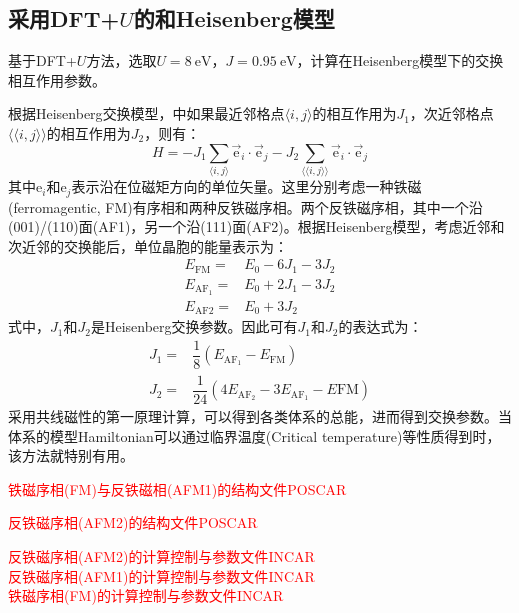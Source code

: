 \subsection{采用\rm{DFT}+$U$的和\rm{Heisenberg}模型}
基于\textrm{DFT}+$U$方法，选取$U=8~\mathrm{eV}$，$J=0.95~\mathrm{eV}$，计算在\textrm{Heisenberg}模型下的交换相互作用参数。

根据\textrm{Heisenberg}交换模型，中如果最近邻格点$\langle i,j\rangle$的相互作用为$J_1$，次近邻格点$\langle\langle i,j\rangle\rangle$的相互作用为$J_2$，则有：
\begin{displaymath}
	H=-J_1\sum_{\langle i,j\rangle}\vec{\mathrm{e}}_i\cdot\vec{\mathrm{e}}_j-J_2\sum_{\langle\langle i,j\rangle\rangle}\vec{\mathrm{e}}_i\cdot\vec{\mathrm{e}}_j
\end{displaymath}
其中$\mathrm{e}_i$和$\mathrm{e}_j$表示沿在位磁矩方向的单位矢量。这里分别考虑一种铁磁\textrm{(ferromagentic, FM)}有序相和两种反铁磁序相。两个反铁磁序相，其中一个沿(001)/(110)面\textrm{(AF1)}，另一个沿(111)面\textrm{(AF2)}。根据\textrm{Heisenberg}模型，考虑近邻和次近邻的交换能后，单位晶胞的能量表示为：
\begin{displaymath}
	\begin{aligned}
		E_{\mathrm{FM}}=&E_0-6J_1-3J_2\\
		E_{\mathrm{AF_1}}=&E_0+2J_1-3J_2\\
		E_{\mathrm{AF2}}=&E_0+3J_2
	\end{aligned}
\end{displaymath}
式中，$J_1$和$J_2$是\textrm{Heisenberg}交换参数。因此可有$J_1$和$J_2$的表达式为：
\begin{displaymath}
	\begin{aligned}
		J_1=&\dfrac18(E_{\mathrm{AF_1}}-E_{\mathrm{FM}})\\
		J_2=&\dfrac1{24}(4E_{\mathrm{AF_2}}-3E_{\mathrm{AF_1}}-E{\mathrm{FM}})
	\end{aligned}
\end{displaymath}
采用共线磁性的第一原理计算，可以得到各类体系的总能，进而得到交换参数。当体系的模型\textrm{Hamiltonian}可以通过临界温度\textrm{(Critical temperature)}等性质得到时，该方法就特别有用。

\textcolor{red}{铁磁序相\textrm{(FM)}与反铁磁相\textrm{(AFM1)}的结构文件\textrm{POSCAR}}

\textcolor{red}{反铁磁序相\textrm{(AFM2)}的结构文件\textrm{POSCAR}}

\textcolor{red}{反铁磁序相\textrm{(AFM2)}的计算控制与参数文件\textrm{INCAR}}\\
\textcolor{red}{反铁磁序相\textrm{(AFM1)}的计算控制与参数文件\textrm{INCAR}}\\
\textcolor{red}{铁磁序相\textrm{(FM)}的计算控制与参数文件\textrm{INCAR}}

